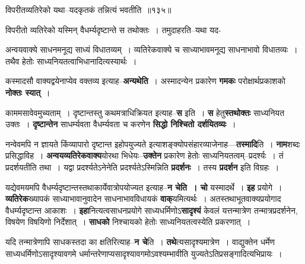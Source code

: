 \documentclass[article,12pt,a4paper]{memoir}
\begin{document}
	  \bigskip
	  \begingroup
	

	  \pstart विपरीतव्यतिरेको यथा--यदकृतकं तन्नित्यं भवतीति ॥१३५॥
	\pend
      
	  \endgroup
	 

	  \pstart {}विपरीतो व्यतिरेको यस्मिन् वैधर्म्यदृष्टान्ते स तथोक्तः । तमुदाहरति--यथा यद-
	\pend
      
	  \endgroup
	

	  \pstart अन्वयवाक्ये साधनमनूद्य साध्यं विधातव्यम् । व्यतिरेकवाक्ये च साध्याभावमनूद्य साधनाभावो विधातव्यः । तथैव हेतोः साध्यनियतत्वाभिधानादित्यस्यार्थः ।
	\pend
      

	  \pstart कस्मादसौ वाक्यद्वयेनाप्येव वक्तव्य इत्याह--\textbf{अन्यथेति} । अस्मादन्येन प्रकारेण \textbf{गमकः} परोक्षार्थप्रकाशको \textbf{नोक्तः स्यात्} ।
	\pend
      

	  \pstart काममसावेवमुच्यताम् । दृष्टान्तस्तु कथमत्राधिक्रियत इत्याह--\textbf{स} इति । \textbf{स} हेतु\textbf{स्तथोक्तः} साध्यनियत उक्तः । \textbf{दृष्टान्तेन} साधर्म्यवता वैधर्म्यवता च करणेन \textbf{सिद्धो निश्चितो दर्शयितव्यः} ।
	\pend
      

	  \pstart नन्वेवमपि न ज्ञायते किंव्यापारो दृष्टान्त इहोपयुज्यते इत्याशङ्क्योपसंहारव्याजेनाह—\textbf{तस्मादि}ति । \textbf{नाम}शब्दः प्रसिद्धाविह । \textbf{अन्वयव्यतिरेकवाक्य}योरथा  भिधेयः--\textbf{उक्तेन} प्रकारेण हेतोः साध्यनियतत्वम्--प्रदर्श्यः । तं प्रदर्शयतीति तथा । यद्वा प्रदर्श्यतेऽनेनेति प्रदर्श्यतेऽस्मिन्निति \textbf{प्रदर्शनः} । तस्य \textbf{प्रदर्शन} इति विग्रहः ।
	\pend
      

	  \pstart यद्येवमयमपि वैधर्म्यदृष्टान्तस्तथाकार्येवात्रोपयोज्यत इत्याह--\textbf{न चेति । चो} यस्मादर्थे । \textbf{इह} प्रयोगे । \textbf{व्यतिरेक}ख्यापकं साध्याभावानुवादेन साधनाभावविधायकं \textbf{वाक्}यमित्यर्थः । अतस्तथाभूतवाक्यप्रयोगाद वैधर्म्यदृष्टान्त आकाशः । \textbf{इहा}नित्यत्वसाधनप्रयोगे साध्यधर्मिणोऽ\textbf{सादृश्यं} केवलं यत्तन्मात्रेण तन्मात्रप्रदर्शनेन, विषयेण विषयिणो निर्देशात् । \textbf{साधको} निश्चायको हेतोः साध्यनियतत्वस्येति प्रकरणात् ।
	\pend
      

	  \pstart यदि तन्मात्रेणापि साधकस्तदा का क्षतिरित्याह--\textbf{न चे}ति । \textbf{तथे}त्यसादृश्यमात्रेण । वाद्युक्तेन धर्मेण साध्यधर्मिणोऽसादृश्यावगमे धर्मान्तरेणाप्यसादृश्यावगमोऽवश्यम्भावीति युज्यतेऽतिप्रसङ्गादित्यभिप्रायः ।
	\pend
	  \bigskip
	  \begingroup
	
\end{document}
